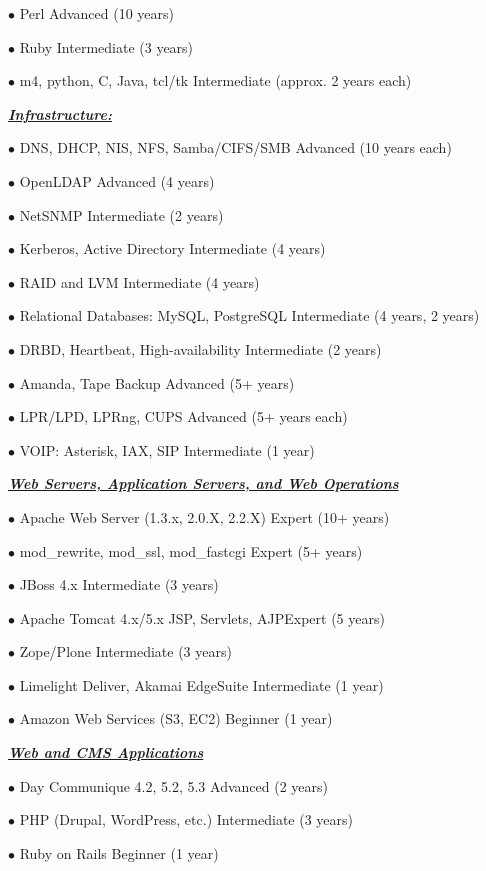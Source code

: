 \documentclass{article}
\newcommand{\skillset}[1]{{ \underline{\textbf{\emph{#1}}}\\  }}
\newcommand{\skill}[2]{{$\bullet$ #1 \hfill #2 }}
\begin{document}
\skill{Perl}{Advanced (10 years)}

\skill{Ruby}{Intermediate (3 years)}

\skill{m4, python, C, Java, tcl/tk}{Intermediate (approx. 2 years each)}



\skillset{Infrastructure: }

\skill{DNS, DHCP, NIS, NFS, Samba/CIFS/SMB}{Advanced (10 years each)}

\skill{OpenLDAP}{Advanced (4 years)}

\skill{NetSNMP}{Intermediate (2 years)}

\skill{Kerberos, Active Directory}{Intermediate (4 years)}

\skill{RAID and LVM}{Intermediate (4 years)}

\skill{Relational Databases: MySQL, PostgreSQL}{Intermediate (4 years, 2 years)}

\skill{DRBD, Heartbeat, High-availability}{Intermediate (2 years)}

\skill{Amanda, Tape Backup}{Advanced (5+ years)}

\skill{LPR/LPD, LPRng, CUPS}{Advanced (5+ years each)}

\skill{VOIP: Asterisk, IAX, SIP}{Intermediate (1 year)}



\skillset{Web Servers, Application Servers, and Web Operations}

\skill{Apache Web Server (1.3.x, 2.0.X, 2.2.X)}{Expert (10+ years)}

\skill{mod\_rewrite, mod\_ssl, mod\_fastcgi}{Expert (5+ years)}

\skill{JBoss 4.x}{Intermediate (3 years)}

\skill{Apache Tomcat 4.x/5.x}

\skill{JSP, Servlets, AJP}{Expert (5 years)}

\skill{Zope/Plone}{Intermediate (3 years)}

\skill{Limelight Deliver, Akamai EdgeSuite}{Intermediate (1 year)}

\skill{Amazon Web Services (S3, EC2)}{Beginner (1 year)}



\skillset{Web and CMS Applications}

\skill{Day Communique 4.2, 5.2, 5.3}{Advanced (2 years)}

\skill{PHP (Drupal, WordPress, etc.)}{Intermediate (3 years)}

\skill{Ruby on Rails}{Beginner (1 year)}
\end{document}
